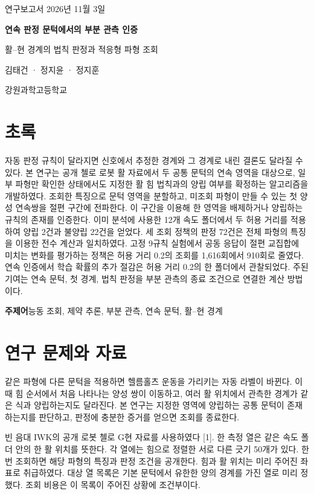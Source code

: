 \documentclass[11pt,a4paper]{article}
\newcommand{\lead}[1]{\textcolor{accent}{\sffamily\bfseries #1}}
\begin{document}
\begin{center}
{\sffamily\small 연구보고서 \quad 2026년 11월 3일}\par\vspace{1.1em}
{\sffamily\bfseries\LARGE 연속 판정 문턱에서의 부분 관측 인증}\par\vspace{.55em}
{\sffamily\large 활–현 경계의 법칙 판정과 적응형 파형 조회}\par\vspace{1em}
김태건 · 정지윤 · 정지훈\par
강원과학고등학교
\end{center}
\section*{초록}
자동 판정 규칙이 달라지면 신호에서 추정한 경계와 그 경계로 내린 결론도 달라질 수 있다. 본 연구는 공개 첼로 로봇 활 자료에서 두 공통 문턱의 연속 영역을 대상으로, 일부 파형만 확인한 상태에서도 지정한 활 힘 법칙과의 양립 여부를 확정하는 알고리즘을 개발하였다. 조회한 특징으로 문턱 영역을 분할하고, 미조회 파형이 만들 수 있는 첫 양성 연속쌍을 절편 구간에 전파한다. 이 구간을 이용해 한 영역을 배제하거나 양립하는 규칙의 존재를 인증한다. 이미 분석에 사용한 12개 속도 폴더에서 두 허용 거리를 적용하여 양립 2건과 불양립 22건을 얻었다. 세 조회 정책의 판정 72건은 전체 파형의 특징을 이용한 전수 계산과 일치하였다. 고정 9규칙 실험에서 공동 응답이 절편 교집합에 미치는 변화를 평가하는 정책은 허용 거리 0.2의 조회를 1,616회에서 910회로 줄였다. 연속 인증에서 학습 확률의 추가 절감은 허용 거리 0.2의 한 폴더에서 관찰되었다. 주된 기여는 연속 문턱, 첫 경계, 법칙 판정을 부분 관측의 종료 조건으로 연결한 계산 방법이다.

\noindent\lead{주제어}\quad 능동 조회, 제약 추론, 부분 관측, 연속 문턱, 활–현 경계

\section{연구 문제와 자료}
같은 파형에 다른 문턱을 적용하면 헬름홀츠 운동을 가리키는 자동 라벨이 바뀐다. 이때 힘 순서에서 처음 나타나는 양성 쌍이 이동하고, 여러 활 위치에서 관측한 경계가 같은 식과 양립하는지도 달라진다. 본 연구는 지정한 영역에 양립하는 공통 문턱이 존재하는지를 판단하고, 판정에 충분한 증거를 얻으면 조회를 종료한다.

빈 음대 IWK의 공개 로봇 첼로 G현 자료를 사용하였다 [1]. 한 측정 열은 같은 속도 폴더 안의 한 활 위치를 뜻한다. 각 열에는 힘으로 정렬한 서로 다른 긋기 50개가 있다. 한 번 조회하면 해당 파형의 특징과 판정 조건을 공개한다. 힘과 활 위치는 미리 주어진 좌표로 취급하였다. 대상 열 목록은 기본 문턱에서 유한한 양의 경계를 가진 열로 미리 정했다. 조회 비용은 이 목록이 주어진 상황에 조건부이다.
\end{document}

